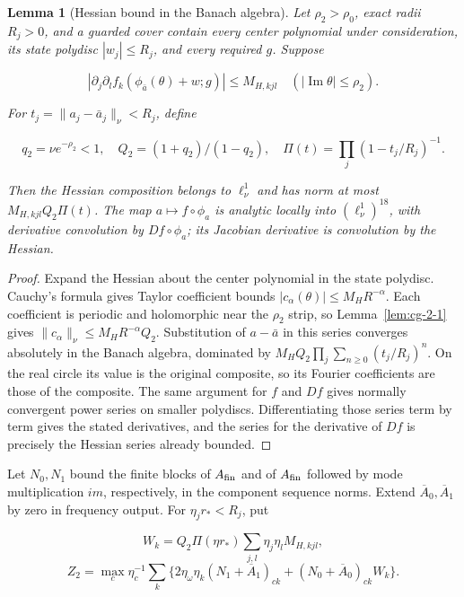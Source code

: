 \documentclass[11pt]{article}
\newtheorem{lemma}{Lemma}[section]
\theoremstyle{definition}
\begin{document}
\begin{lemma}[Hessian bound in the Banach algebra]\label{lem:cg-3-1} Let $\rho_2>\rho_0$, exact radii $R_j>0$, and a guarded cover contain every center polynomial under consideration, its state polydisc $|w_j|\le R_j$, and every required $g$. Suppose

\[
 |\partial_j\partial_l f_k(\phi_{\bar a}(\theta)+w;g)|
 \le M_{H,kjl}\quad(|\operatorname{Im}\theta|\le\rho_2).
\]

For $t_j=\|a_j-\bar a_j\|_\nu<R_j$, define

\[
 q_2=\nu e^{-\rho_2}<1,\quad Q_2=(1+q_2)/(1-q_2),\quad
 \Pi(t)=\prod_j(1-t_j/R_j)^{-1}.
\]

Then the Hessian composition belongs to $\ell^1_\nu$ and has norm at most $M_{H,kjl}Q_2\Pi(t)$. The map $a\mapsto f\circ\phi_a$ is analytic locally into $(\ell^1_\nu)^{18}$, with derivative convolution by $Df\circ\phi_a$; its Jacobian derivative is convolution by the Hessian.

\end{lemma}

\begin{proof} Expand the Hessian about the center polynomial in the state polydisc. Cauchy's formula gives Taylor coefficient bounds $|c_\alpha(\theta)|\le M_H R^{-\alpha}$. Each coefficient is periodic and holomorphic near the $\rho_2$ strip, so Lemma~\ref{lem:cg-2-1} gives $\|c_\alpha\|_\nu\le M_H R^{-\alpha}Q_2$. Substitution of $a-\bar a$ in this series converges absolutely in the Banach algebra, dominated by $M_HQ_2\prod_j\sum_{n\ge0}(t_j/R_j)^n$. On the real circle its value is the original composite, so its Fourier coefficients are those of the composite. The same argument for $f$ and $Df$ gives normally convergent power series on smaller polydiscs. Differentiating those series term by term gives the stated derivatives, and the series for the derivative of $Df$ is precisely the Hessian series already bounded. \end{proof}

Let $N_0,N_1$ bound the finite blocks of $A_{\rm fin}$ and of $A_{\rm fin}$ followed by mode multiplication $im$, respectively, in the component sequence norms. Extend $\overline A_0,\overline A_1$ by zero in frequency output. For $\eta_jr_*<R_j$, put

\[
 W_k=Q_2\Pi(\eta r_*)\sum_{j,l}\eta_j\eta_l M_{H,kjl},
\]
\[
 Z_2=\max_c\eta_c^{-1}\sum_k
 \{2\eta_\omega\eta_k(N_1+\overline A_1)_{ck}
                  +(N_0+\overline A_0)_{ck}W_k\}.
\]
\end{document}
